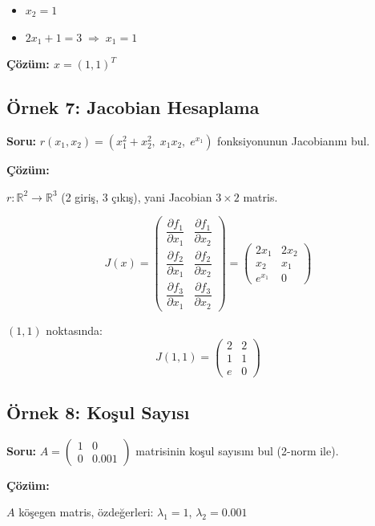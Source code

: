 \documentclass[12pt,a4paper]{article}
\theoremstyle{definition}
\theoremstyle{remark}
\begin{document}
\begin{itemize}
    \item $x_2 = 1$
    \item $2x_1 + 1 = 3 \;\Rightarrow\; x_1 = 1$
\end{itemize}

\textbf{\c{C}\"oz\"um: $x = (1, 1)^T$}

\subsection{\"Ornek 7: Jacobian Hesaplama}

\textbf{Soru:} $r(x_1, x_2) = (x_1^2 + x_2^2,\; x_1 x_2,\; e^{x_1})$ fonksiyonunun Jacobian{\i}n{\i} bul.

\textbf{\c{C}\"oz\"um:}

$r: \mathbb{R}^2 \to \mathbb{R}^3$ (2 giri\c{s}, 3 \c{c}{\i}k{\i}\c{s}), yani Jacobian $3 \times 2$ matris.

\[
J(x) = \begin{pmatrix} \dfrac{\partial f_1}{\partial x_1} & \dfrac{\partial f_1}{\partial x_2} \\[8pt] \dfrac{\partial f_2}{\partial x_1} & \dfrac{\partial f_2}{\partial x_2} \\[8pt] \dfrac{\partial f_3}{\partial x_1} & \dfrac{\partial f_3}{\partial x_2} \end{pmatrix} = \begin{pmatrix} 2x_1 & 2x_2 \\ x_2 & x_1 \\ e^{x_1} & 0 \end{pmatrix}
\]

$(1, 1)$ noktas{\i}nda:
\[
J(1, 1) = \begin{pmatrix} 2 & 2 \\ 1 & 1 \\ e & 0 \end{pmatrix}
\]

\subsection{\"Ornek 8: Ko\c{s}ul Say{\i}s{\i}}

\textbf{Soru:} $A = \begin{pmatrix} 1 & 0 \\ 0 & 0.001 \end{pmatrix}$ matrisinin ko\c{s}ul say{\i}s{\i}n{\i} bul (2-norm ile).

\textbf{\c{C}\"oz\"um:}

$A$ k\"o\c{s}egen matris, \"ozde\u{g}erleri: $\lambda_1 = 1$, $\lambda_2 = 0.001$
\end{document}
